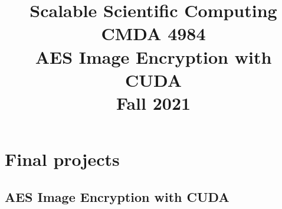 \documentclass{book}[11pt]
\title{Scalable Scientific Computing \\ CMDA 4984 \\ \vspace{16pt}AES Image Encryption with CUDA\\ Fall 2021}
\begin{document}
\setlength{\parindent}{0cm}

\maketitle
\mytoc

\part{Final projects}

\chapter{AES Image Encryption with CUDA}
\label{projectShortName.chap}

\end{document}
